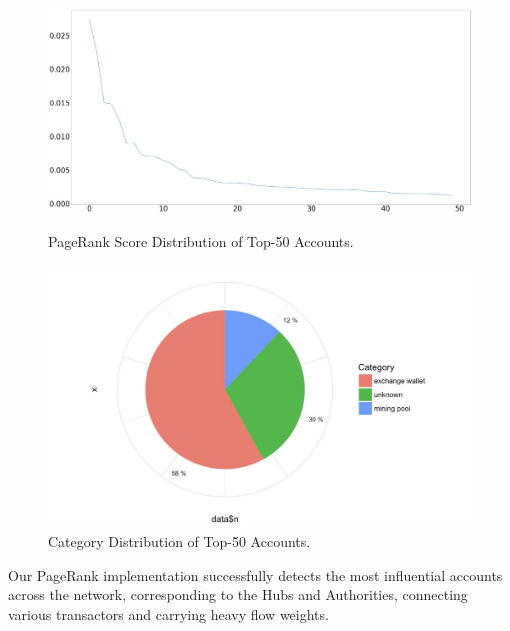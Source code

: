 \begin{figure}[t]
 \begin{minipage}[b]{.5\textwidth}
\includegraphics[width=1\columnwidth]{images/7_implemenation_and_usecases/pagerank-score-distribution-of-top-50-accounts.jpeg}
\caption{PageRank Score Distribution of Top-50 Accounts.}
\label{fig:pagerank-score-distribution-of-top-50-accounts}
 \end{minipage}
 \begin{minipage}[b]{.5\textwidth}
\includegraphics[width=1.0\columnwidth]{images/7_implemenation_and_usecases/category-distribution-of-top-50-accounts.jpeg}
\caption{Category Distribution of Top-50 Accounts.}
\label{fig:category-distribution-of-top-50-accounts}
 \end{minipage}
\end{figure}

Our PageRank implementation successfully detects the most influential accounts across the network, corresponding to the Hubs and Authorities, connecting various transactors and carrying heavy flow weights.

